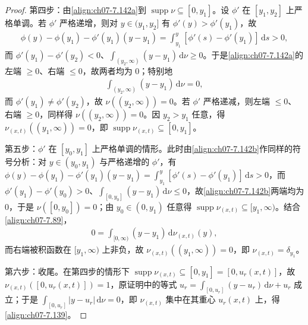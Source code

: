 \documentclass[../../main.tex]{subfiles}%
\begin{document}
\begin{proof}
第四步：由\eqref{align:ch07-7.142a}到 $\operatorname{supp}\nu\subseteq[0,y_1]$。设 $\phi'$ 在 $[y_1,y_2]$ 上严格单调。若 $\phi'$ 严格递增，则对 $y\in(y_1,y_2]$ 有 $\phi'(y)>\phi'(y_1)$，故
\begin{align*}
\phi(y)-\phi(y_1)-\phi'(y_1)(y-y_1)=\int_{y_1}^y[\phi'(s)-\phi'(y_1)]\,\mathrm{d}s>0,
\end{align*}
而 $\phi'(y_1)-\phi'(y_2)<0$、$\int_{(y_2,\infty)}(y-y_1)\,\mathrm{d}\nu\geqslant0$。于是\eqref{align:ch07-7.142a}的左端 $\geqslant0$、右端 $\leqslant0$，故两者均为 $0$；特别地
\begin{align*}
[\phi'(y_1)-\phi'(y_2)]\int_{(y_2,\infty)}(y-y_1)\,\mathrm{d}\nu=0,
\end{align*}
而 $\phi'(y_1)\neq\phi'(y_2)$，故 $\nu((y_2,\infty))=0$。若 $\phi'$ 严格递减，则左端 $\leqslant0$、右端 $\geqslant0$，同样得 $\nu((y_2,\infty))=0$。因 $y_2>y_1$ 任意，得 $\nu_{(x,t)}((y_1,\infty))=0$，即 $\operatorname{supp}\nu_{(x,t)}\subseteq[0,y_1]$。

第五步：$\phi'$ 在 $[y_0,y_1]$ 上严格单调的情形。此时由\eqref{align:ch07-7.142b}作同样的符号分析：对 $y\in(y_0,y_1)$ 与严格递增的 $\phi'$，有 $\phi(y)-\phi(y_1)-\phi'(y_1)(y-y_1)=\int_{y_1}^y[\phi'(s)-\phi'(y_1)]\,\mathrm{d}s>0$，而 $\phi'(y_1)-\phi'(y_0)>0$、$\int_{[0,y_0]}(y-y_1)\,\mathrm{d}\nu\leqslant0$，故\eqref{align:ch07-7.142b}两端均为 $0$，于是 $\nu([0,y_0])=0$；由 $y_0\in(0,y_1)$ 任意得 $\operatorname{supp}\nu_{(x,t)}\subseteq[y_1,\infty)$。结合\eqref{align:ch07-7.89}，
\begin{align*}
0=\int_{[0,\infty)}(y-y_1)\,\mathrm{d}\nu_{(x,t)}(y),
\end{align*}
而右端被积函数在 $[y_1,\infty)$ 上非负，故 $\nu_{(x,t)}((y_1,\infty))=0$，即 $\nu_{(x,t)}=\delta_{y_1}$。

第六步：收尾。在第四步的情形下 $\operatorname{supp}\nu_{(x,t)}\subseteq[0,y_1]=[0,u_r(x,t)]$，故 $\nu_{(x,t)}([0,u_r(x,t)])=1$，原证明中的等式 $u_r=\int_{[0,u_r]}(y-u_r)\,\mathrm{d}\nu+u_r$ 成立；于是 $\int_{[0,u_r]}|y-u_r|\,\mathrm{d}\nu=0$，即 $\nu_{(x,t)}$ 集中在其重心 $u_r(x,t)$ 上，得\eqref{align:ch07-7.139}。
\end{proof}
\end{document}
